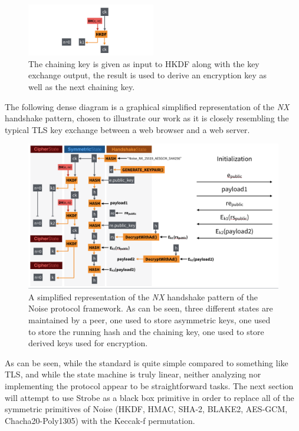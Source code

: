 \documentclass{article}
\begin{document}
\begin{figure}[H]
\centering
\includegraphics[width=0.5\textwidth]{rwcimg/ck.png}
\caption{The chaining key is given as input to HKDF along with the key exchange output, the result is used to derive an encryption key as well as the next chaining key.}
\end{figure}

The following dense diagram is a graphical simplified representation of the \emph{NX} handshake pattern, chosen to illustrate our work as it is closely resembling the typical TLS key exchange between a web browser and a web server.

\begin{figure}[H]
\centering
\includegraphics[width=\textwidth]{rwcimg/noise_nx.png}
\caption{A simplified representation of the \emph{NX} handshake pattern of the Noise protocol framework. As can be seen, three different states are maintained by a peer, one used to store asymmetric keys, one used to store the running hash and the chaining key, one used to store derived keys used for encryption.}
\label{fig:noise_nx}
\end{figure}

As can be seen, while the standard is quite simple compared to something like TLS, and while the state machine is truly linear, neither analyzing nor implementing the protocol appear to be straightforward tasks. The next section will attempt to use Strobe as a black box primitive in order to replace all of the symmetric primitives of Noise (HKDF, HMAC, SHA-2, BLAKE2, AES-GCM, Chacha20-Poly1305) with the Keccak-f permutation.
\end{document}
